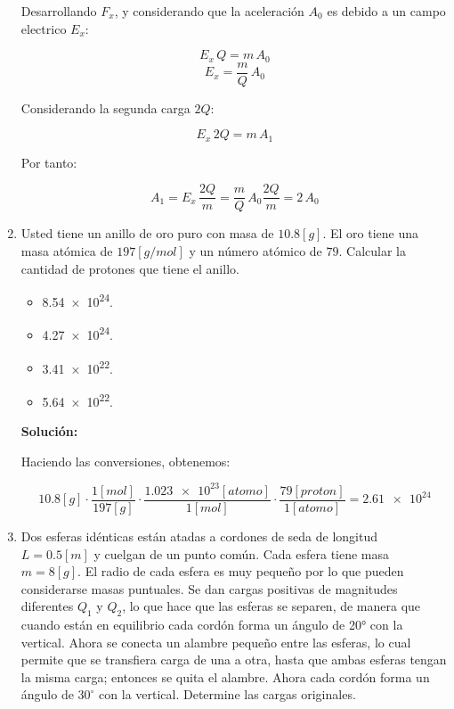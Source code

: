 \documentclass[letter,11pt]{article}
\begin{document}
\begin{enumerate}
Desarrollando $F_x$, y considerando que la aceleración $A_0$ es debido a un
campo electrico $E_x$:

\begin{equation*}
    E_x\,Q = m\,A_0
\end{equation*}
\begin{equation*}
    E_x = \frac{m}{Q}\,A_0
\end{equation*}

Considerando la segunda carga $2Q$:

\begin{equation*}
    E_x\,2Q = m\,A_1
\end{equation*}

Por tanto:

\begin{equation*}
    A_1 = E_x\,\frac{2Q}{m} = \frac{m}{Q}\,A_0 \frac{2Q}{m} = 2\,A_0
\end{equation*}

\item Usted tiene un anillo de oro puro con masa de $10.8 [g]$. El oro tiene una
masa atómica de $197 [g/mol]$ y un número atómico de $79$. Calcular la cantidad
de protones que tiene el anillo.

\begin{itemize}
    \item \num{8.54e24}.
    \item \num{4.27e24}.
    \item \num{3.41e22}.
    \item \num{5.64e22}.
\end{itemize}

\textbf{Solución:}

Haciendo las conversiones, obtenemos:

\begin{equation*}
    10.8 [g] \cdot \frac{1 [mol]}{197 [g]} \cdot \frac{\num{1.023e23}[atomo]}{1 [mol]} \cdot \frac{79 [proton]}{1 [atomo]} = \num{2.61e24}
\end{equation*}

\item Dos esferas idénticas están atadas a cordones de seda de longitud
$L = 0.5 [m]$ y cuelgan de un punto común. Cada esfera tiene masa $m =8 [g]$. El
radio de cada esfera es muy pequeño por lo que pueden considerarse masas
puntuales. Se dan cargas positivas de magnitudes diferentes $Q_1$ y $Q_2$, lo
que hace que las esferas se separen, de manera que cuando están en equilibrio
cada cordón forma un ángulo de 20° con la vertical. Ahora se conecta un alambre
pequeño entre las esferas, lo cual permite que se transfiera carga de una a
otra, hasta que ambas esferas tengan la misma carga; entonces se quita el
alambre. Ahora cada cordón forma un ángulo de $30^\circ$ con la vertical.
Determine las cargas originales.


\end{enumerate}
\end{document}
